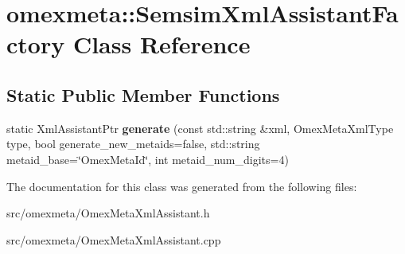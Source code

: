\hypertarget{classomexmeta_1_1SemsimXmlAssistantFactory}{}\section{omexmeta\+:\+:Semsim\+Xml\+Assistant\+Factory Class Reference}
\label{classomexmeta_1_1SemsimXmlAssistantFactory}
\subsection*{Static Public Member Functions}
\begin{DoxyCompactItemize}
\item 
\mbox{\label{classomexmeta_1_1SemsimXmlAssistantFactory_a179ac91d78753a91e1f962a7ca974246}} 
static Xml\+Assistant\+Ptr {\bfseries generate} (const std\+::string \&xml, Omex\+Meta\+Xml\+Type type, bool generate\+\_\+new\+\_\+metaids=false, std\+::string metaid\+\_\+base=\char`\"{}Omex\+Meta\+Id\char`\"{}, int metaid\+\_\+num\+\_\+digits=4)
\end{DoxyCompactItemize}


The documentation for this class was generated from the following files\+:\begin{DoxyCompactItemize}
\item 
src/omexmeta/Omex\+Meta\+Xml\+Assistant.\+h\item 
src/omexmeta/Omex\+Meta\+Xml\+Assistant.\+cpp\end{DoxyCompactItemize}
